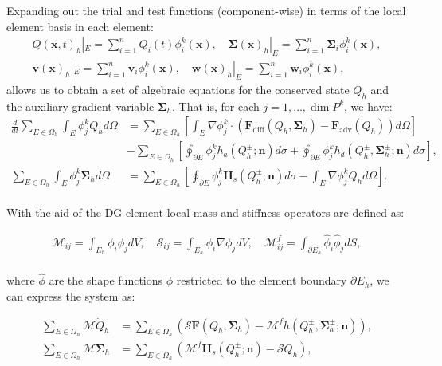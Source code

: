 \documentclass[11pt]{article}
\begin{document}
Expanding out the trial and test functions (component-wise) in terms of the local element basis in each element:
\begin{align}
Q(\mathbf{x}, t)_h|_E = \sum_{i=1}^n Q_i(t)\phi_i^k(\mathbf{x}), \quad
\mathbf{\Sigma}(\mathbf{x})_h|_E = \sum_{i=1}^n \mathbf{\Sigma}_i\phi_i^k(\mathbf{x}),\\
\mathbf{v}(\mathbf{x})_h|_E = \sum_{i=1}^n \mathbf{v}_i\phi_i^k(\mathbf{x}), \quad
\mathbf{w}(\mathbf{x})_h|_E = \sum_{i=1}^n \mathbf{w}_i\phi_i^k(\mathbf{x}),\quad
\end{align}
allows us to obtain a set of algebraic equations for the conserved state $Q_h$ and the auxiliary gradient variable $\mathbf{\Sigma}_h$. That is, for each $j = 1, \dots, \dim P^k$, we have:
\begin{align}
\frac{d}{dt} \sum_{E\in\Omega_h}\int_E \phi_j^k Q_h d\Omega &= \sum_{E\in\Omega_h}
\left\lbrack\int_E \nabla\phi_j^k\cdot\left(\mathbf{F}_\text{diff}(Q_h, \mathbf{\Sigma}_h) -
\mathbf{F}_\text{adv}(Q_h)\right)d\Omega\right\rbrack \nonumber \\
&- \sum_{E\in\Omega_h}\left\lbrack\oint_{\partial E}\phi_j^k h_a(Q_h^\pm; \mathbf{n}) d\sigma + \oint_{\partial E} \phi_j^k h_d(Q_h^\pm,\mathbf{\Sigma}_h^\pm; \mathbf{n}) d\sigma\right\rbrack, \\
\sum_{E\in\Omega_h}\int_E\phi_j^k \mathbf{\Sigma}_h d\Omega &= \sum_{E\in\Omega_h}\left\lbrack
\oint_{\partial{E}}\phi_j^k \mathbf{H}_s(Q^\pm_h; \mathbf{n}
)d\sigma -
\int_E\nabla\phi^k_j Q_h d\Omega\right\rbrack. \\
\end{align}

With the aid of the DG element-local mass and stiffness operators are defined as:

\begin{align}
  \mathcal{M}_{ij} = \int_{E_h} \phi_i \phi_j dV,\quad \mathcal{S}_{ij} = \int_{E_h} \phi_i \nabla{\phi_j} dV, \quad \mathcal{M}^f_{ij} = \int_{\partial E_h} \hat{\phi}_i \hat{\phi}_j dS,\\
\end{align}

where $\hat{\phi}$ are the shape functions $\phi$ restricted to the element boundary $\partial E_h$, we can express the system as:

\begin{align}
\sum_{E\in\Omega_h} \mathcal{M} \dot{Q}_h &= \sum_{E\in\Omega_h}\left(
\mathcal{S} \mathbf{F}(Q_h, \mathbf{\Sigma}_h) - \mathcal{M}^f h(Q_h^\pm,\mathbf{\Sigma}_h^\pm; \mathbf{n}) \right),\\
\sum_{E\in\Omega_h} \mathcal{M} \mathbf{\Sigma}_h &= \sum_{E\in\Omega_h} \left( \mathcal{M}^f \mathbf{H}_s(Q^\pm_h; \mathbf{n}) - \mathcal{S} Q_h \right),
\end{align}
\end{document}
